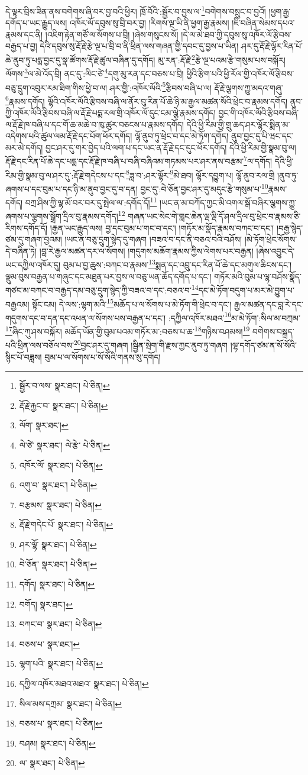 དེ་ལྟར་བྲིས་ཟིན་ནས་བགེགས་ཞི་བར་བྱ་བའི་ཕྱིར། ཁྲོ་བོའི་:སྦྱོར་བ་བྱས་ལ་\footnote{སྦྱོར་བ་ལས་  སྣར་ཐང་།  པེ་ཅིན། }བགེགས་བསྲུང་བ་བྱའོ། །ཕྱག་རྒྱ་དགོད་པ་ཡང་རྒྱུད་ལས། འཁོར་ལོ་དབུས་སུ་བྲི་བར་བྱ། །རིགས་ལྔ་ཡི་ནི་ཕྱག་རྒྱ་རྣམས། །ཇི་བཞིན་སེམས་དཔའ་རྣམས་དང་ནི། །འཇིག་རྟེན་གཙོ་ལ་སོགས་པ་བྲི། །ཞེས་གསུངས་སོ། །དེ་ལ་མེ་ཐབ་ཀྱི་དབུས་སུ་འཁོར་ལོ་རྩིབས་བརྒྱད་པ་བྱ། དེའི་དབུས་སུ་རྡོ་རྗེ་རྩེ་ལྔ་པ་བྲི་བ་ནི་ཕྲིན་ལས་གཞན་གྱི་དབང་དུ་བྱས་པ་ཡིན། ཤར་དུ་རྡོ་རྗེ་ལྷོར་རིན་པོ་ཆེ་ནུབ་ཏུ་པདྨ་བྱང་དུ་སྣ་ཚོགས་རྡོ་རྗེ་ཚུལ་བཞིན་དུ་དགོད། མུ་རན་:རྡོ་རྗེ་\footnote{རྡོ་རྗེ་རྐྱང་བ་  སྣར་ཐང་།  པེ་ཅིན། }རྩེ་ལྔ་པའམ་རྩེ་གསུམ་པས་བསྐོར། ལོགས་\footnote{ལོག་  སྣར་ཐང་། }ལ་མེ་འོད་བྲི། ནང་དུ་:ལིང་ཙེ་\footnote{ལེ་ཙེ་  སྣར་ཐང་། ལེ་རྩེ་  པེ་ཅིན། }དགུ་མུ་རན་དང་བཅས་པ་བྲི། ཕྱིའི་རྩིག་པའི་ཕྱི་རོལ་གྱི་འཁོར་ལོ་རྩིབས་བཅུ་དྲུག་འབུར་རམ་ཐིག་གིས་ཕྱེ་བ་ལ། ཤར་གྱི་:འཁོར་ལོའི་\footnote{འཁོར་ལོ་  སྣར་ཐང་།  པེ་ཅིན། }རྩིབས་བཞི་པ་ལ། རྡོ་རྗེ་ལྕགས་ཀྱུ་མདའ་གཞུ་\footnote{འགུ་བ་  སྣར་ཐང་།  པེ་ཅིན། }རྣམས་དགོད། ལྷོའི་འཁོར་ལོའི་རྩིབས་བཞི་ལ་ནོར་བུ་རིན་པོ་ཆེ་ཉི་མ་རྒྱལ་མཚན་སོའི་ཕྲེང་བ་རྣམས་དགོད། ནུབ་ཀྱི་འཁོར་ལོའི་རྩིབས་བཞི་ལ་རྡོ་རྗེ་པདྨ་རལ་གྲི་འཁོར་ལོ་དུང་ངམ་ལྕེ་རྣམས་དགོད། བྱང་གི་འཁོར་ལོའི་རྩིབས་བཞི་ལ་རྡོ་རྗེ་ཁ་བཞི་པ་དང་གོ་ཆ་མཆེ་བ་ཁུ་ཚུར་བཅངས་པ་རྣམས་དགོད། དེའི་ཕྱི་རིམ་གྱི་གྲུ་ཆད་ཤར་ལྷོར་སྨིན་མ་འདེགས་པའི་ཚུལ་ལམ་རྡོ་རྗེ་དང་པོག་ཕོར་དགོད། ལྷོ་ནུབ་ཏུ་ཕྲེང་བ་དང་མེ་ཏོག་དགོད། ནུབ་བྱང་དུ་པི་ཝང་དང་མར་མེ་དགོད། བྱང་ཤར་དུ་གར་བྱེད་པའི་ལག་པ་དང་ཡང་ན་རྡོ་རྗེ་དང་དུང་ཕོར་དགོད། དེའི་ཕྱི་རིམ་གྱི་སྣམ་བུ་ལ། རྡོ་རྗེ་དང་རིན་པོ་ཆེ་དང་པདྨ་དང་རྡོ་རྗེ་ཁ་བཞི་པ་བཞི་བཞིའམ་གཏམས་པར་ཤར་ནས་བརྩམ་\footnote{བརྩམས་  སྣར་ཐང་།  པེ་ཅིན། }ལ་དགོད། དེའི་ཕྱི་རིམ་གྱི་སྣམ་བུ་ལ་ཤར་དུ་:རྡོ་རྗེ་གདེངས་པ་དང་\footnote{རྡོ་རྗེ་གདེང་པོ་  སྣར་ཐང་།  པེ་ཅིན། }ཟླ་བ་:ཤར་ལྷོར་\footnote{ཤར་ལྷོ་  སྣར་ཐང་།  པེ་ཅིན། }མེ་ཐབ། ལྷོར་དབྱུག་པ། ལྷོ་ནུབ་རལ་གྲི །ནུབ་ཏུ་ཞགས་པ་དང་བུམ་པ་དང་ཉི་མ་ནུབ་བྱང་དུ་བ་དན། བྱང་དུ་:བེ་ཅོན་བྱང་ཤར་དུ་མདུང་རྩེ་གསུམ་པ་\footnote{བེ་ཅོན་  སྣར་ཐང་།  པེ་ཅིན། }རྣམས་དགོད། བཀྲ་ཤིས་ཀྱི་ལྷ་མོ་བར་བར་དུ་སྤེལ་ལ་:དགོད་དོ།\footnote{དགོད།  སྣར་ཐང་།  པེ་ཅིན། } །ཡང་ན་མ་བཀོད་ཀྱང་མི་འགལ་སྒོ་བཞིར་ལྕགས་ཀྱུ་ཞགས་པ་ལྕགས་སྒྲོག་དྲིལ་བུ་རྣམས་དགོད།\footnote{བགོད།  སྣར་ཐང་། } གཞན་ཡང་སེང་གེ་གླང་ཆེན་ལྡ་ལྡི་དོ་ཤལ་དྲིལ་བུ་ཕྲེང་བ་རྣམས་ཅི་རིགས་དགོད་དོ། །རྒྱན་ཡང་རྒྱུད་ལས། བྱ་དང་བུམ་པ་གང་བ་དང་། །གཏོར་མ་སྣོད་རྣམས་བཀང་བ་དང་། །བརྒྱ་སྙེད་ཙམ་དུ་གཞག་བྱའམ། །ཡང་ན་བཅུ་དྲུག་སྙེད་དུ་གཞག །བཟའ་བ་དང་ནི་བཅའ་བའི་བཤོས། །མེ་ཏོག་ཕྲེང་སོགས་དེ་བཞིན་ཏེ། །བླ་རེ་རྒྱལ་མཚན་དར་ལ་སོགས། །གདུགས་མཆོག་རྣམས་ཀྱིས་ལེགས་པར་བརྒྱན། །ཞེས་འབྱུང་དེ་ཡང་དཀྱིལ་འཁོར་དུ། བུམ་པ་བྱ་ཆུས་:བཀང་བ་རྣམས་\footnote{བཀང་བ་  སྣར་ཐང་།  པེ་ཅིན། }སྨན་དང་འབྲུ་དང་རིན་པོ་ཆེ་དང་མགུལ་ཆིངས་དང་། ལྡུམ་བུས་བརྒྱན་པ་གཞུང་དང་མཐུན་པར་བྱས་ལ་བཅུ་ཡན་ཆོད་དགོད་པ་དང་། གཏོར་མའི་བུམ་པ་ལྷ་བཤོས་སྣོད་གཙང་མ་བཀང་བ་བརྒྱད་དམ་བཅུ་དྲུག་སྙེད་ཀྱི་བཟའ་བ་དང་:བཅའ་བ་\footnote{བཅས་པ་  སྣར་ཐང་། }དང་མེ་ཏོག་བདུག་པ་མར་མེ་བྱུག་པ་བརྒྱའམ། སྟོང་ངམ། དེ་ལས་:ལྷག་མའི་\footnote{ལྷག་པའི་  སྣར་ཐང་།  པེ་ཅིན། }མཆོད་པ་ལ་སོགས་པ་མེ་ཏོག་གི་ཕྲེང་བ་དང་། རྒྱལ་མཚན་དང་བླ་རེ་དང་གདུགས་དང་བ་དན་དང་འཕན་ལ་སོགས་པས་བརྒྱན་པ་དང་། :དཀྱིལ་འཁོར་མཐའ་\footnote{དཀྱིལ་འཁོར་མཐའ་མཐའ་  སྣར་ཐང་།  པེ་ཅིན། }མ་མེ་ཏོག་:སིལ་མ་བཀྲམ་\footnote{སིལ་མས་དཀྲམ་  སྣར་ཐང་།  པེ་ཅིན། }ཞིང་ཀུ་ཤས་བསྐོར། མཆོད་ཡོན་གྱི་བུམ་པའམ་གཏོར་མ་:བཅས་པ་ཆ་\footnote{བཅས་པ་  སྣར་ཐང་།  པེ་ཅིན། }གཉིས་བཤམས།\footnote{བཤམ།  སྣར་ཐང་།  པེ་ཅིན། } བགེགས་བསྐྲད་པའི་ཕྲིན་ལས་བཅོལ་བས་\footnote{ལ་  སྣར་ཐང་།  པེ་ཅིན། }བྱང་ཤར་དུ་གཞག །སྦྱིན་སྲེག་གི་རྫས་ཀྱང་ནུབ་ཏུ་གཞག །ལྷ་དགོད་ཙམ་ན་སོ་སོའི་སྙིང་པོ་བཟླས། བུམ་པ་ལ་སོགས་པ་སོ་སོའི་གནས་སུ་དགོད། 